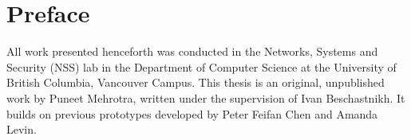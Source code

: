 
\chapter{Preface}

 All work presented henceforth was conducted in the Networks, Systems and Security (NSS) lab in the Department of Computer Science at the University of British Columbia, Vancouver Campus. This thesis is an original, unpublished work by Puneet Mehrotra, written under the supervision of Ivan Beschastnikh. It builds on previous prototypes developed by Peter Feifan Chen and Amanda Levin.
